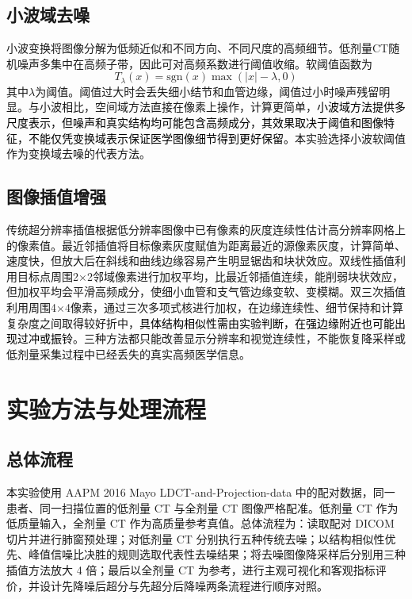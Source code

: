 \documentclass[10.5pt,compsoc,UTF8]{CjC}
\newcommand{\added}[1]{\textcolor{black}{#1}}
\newcommand{\redcite}[1]{{\color{black}\cite{#1}}}
\theoremstyle{mystyle}
\begin{document}
\subsection{小波域去噪}
小波变换将图像分解为低频近似和不同方向、不同尺度的高频细节。低剂量CT随机噪声多集中在高频子带，因此可对高频系数进行阈值收缩。软阈值函数为\redcite{donoho1995denoising}
\[
T_{\lambda}(x)=\mathrm{sgn}(x)\max(|x|-\lambda,0)
\]
其中\added{\(\lambda\)}为阈值。阈值过大时会丢失细小结节和血管边缘，阈值过小时噪声残留明显。与小波相比，空间域方法直接在像素上操作，计算更简单，\added{小波域方法提供多尺度表示，但噪声和真实结构均可能包含高频成分，其效果取决于阈值和图像特征，不能仅凭变换域表示保证医学图像细节得到更好保留。}本实验选择小波软阈值作为变换域去噪的代表方法。
\subsection{图像插值增强}
传统超分辨率插值根据低分辨率图像中已有像素的灰度连续性估计高分辨率网格上的像素值\redcite{gonzalez2018digital}。最近邻插值将目标像素灰度赋值为距离最近的源像素灰度，计算简单、速度快，但放大后在斜线和曲线边缘容易产生明显锯齿和块状效应。双线性插值利用目标点周围2×2邻域像素进行加权平均，比最近邻插值连续，能削弱块状效应，但加权平均会平滑高频成分，使细小血管和支气管边缘变软、变模糊。双三次插值利用周围4×4像素，通过三次多项式核进行加权，在边缘连续性、细节保持和计算复杂度之间取得较好折中，\added{具体结构相似性需由实验判断，在强边缘附近也可能出现过冲或振铃}\redcite{keys1981cubic}。三种方法都只能改善显示分辨率和视觉连续性，不能恢复降采样或低剂量采集过程中已经丢失的真实高频医学信息。
\section{\heiti 实验方法与处理流程}
\subsection{总体流程}

本实验使用 AAPM 2016 Mayo LDCT-and-Projection-data 中的配对数据\redcite{mccollough2017dataset}，同一患者、同一扫描位置的低剂量 CT 与全剂量 CT 图像严格配准。低剂量 CT 作为低质量输入，全剂量 CT 作为高质量参考真值。总体流程为：读取配对 DICOM 切片并进行肺窗预处理；对低剂量 CT 分别执行五种传统去噪；以结构相似性优先、峰值信噪比决胜的规则选取代表性去噪结果；将去噪图像降采样后分别用三种插值方法放大 4 倍；最后以全剂量 CT 为参考，进行主观可视化和客观指标评价，并设计先降噪后超分与先超分后降噪两条流程进行顺序对照。
\end{document}
